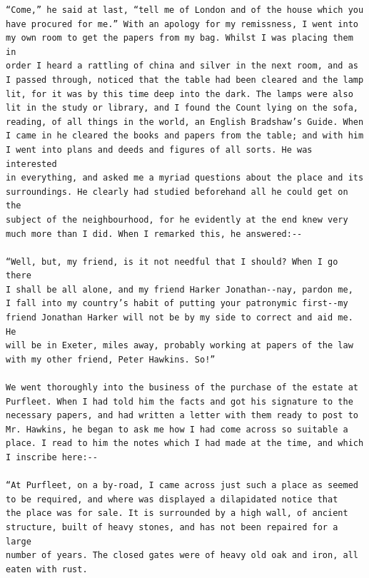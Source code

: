 \documentclass{article}
\begin{document}
\begin{verbatim}
“Come,” he said at last, “tell me of London and of the house which you
have procured for me.” With an apology for my remissness, I went into
my own room to get the papers from my bag. Whilst I was placing them in
order I heard a rattling of china and silver in the next room, and as
I passed through, noticed that the table had been cleared and the lamp
lit, for it was by this time deep into the dark. The lamps were also
lit in the study or library, and I found the Count lying on the sofa,
reading, of all things in the world, an English Bradshaw’s Guide. When
I came in he cleared the books and papers from the table; and with him
I went into plans and deeds and figures of all sorts. He was interested
in everything, and asked me a myriad questions about the place and its
surroundings. He clearly had studied beforehand all he could get on the
subject of the neighbourhood, for he evidently at the end knew very
much more than I did. When I remarked this, he answered:--

“Well, but, my friend, is it not needful that I should? When I go there
I shall be all alone, and my friend Harker Jonathan--nay, pardon me,
I fall into my country’s habit of putting your patronymic first--my
friend Jonathan Harker will not be by my side to correct and aid me. He
will be in Exeter, miles away, probably working at papers of the law
with my other friend, Peter Hawkins. So!”

We went thoroughly into the business of the purchase of the estate at
Purfleet. When I had told him the facts and got his signature to the
necessary papers, and had written a letter with them ready to post to
Mr. Hawkins, he began to ask me how I had come across so suitable a
place. I read to him the notes which I had made at the time, and which
I inscribe here:--

“At Purfleet, on a by-road, I came across just such a place as seemed
to be required, and where was displayed a dilapidated notice that
the place was for sale. It is surrounded by a high wall, of ancient
structure, built of heavy stones, and has not been repaired for a large
number of years. The closed gates were of heavy old oak and iron, all
eaten with rust.


\end{verbatim}
\end{document}
